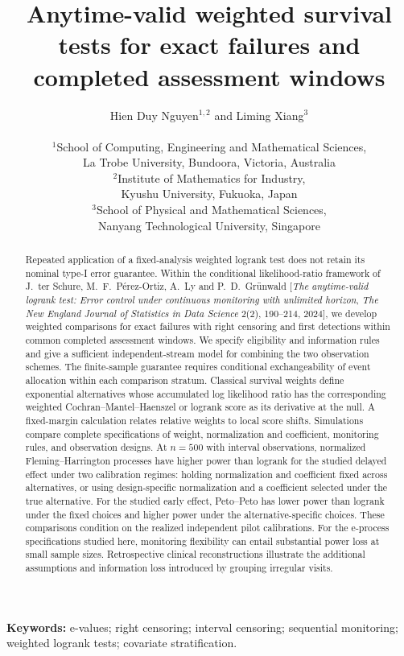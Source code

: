 \documentclass[12pt]{article}
\title{\textbf{Anytime-valid weighted survival tests for exact failures and completed assessment windows}}
\author{%
 Hien Duy Nguyen$^{1,2}$ and Liming Xiang$^3$\\[0.6em]
 \parbox{0.94\textwidth}{\centering\small
 $^1$School of Computing, Engineering and Mathematical Sciences,\\
 La Trobe University, Bundoora, Victoria, Australia\\[0.3em]
 $^2$Institute of Mathematics for Industry,\\
 Kyushu University, Fukuoka, Japan\\[0.3em]
 $^3$School of Physical and Mathematical Sciences,\\
 Nanyang Technological University, Singapore}%
}
\date{}
\theoremstyle{definition}
\theoremstyle{remark}
\begin{document}
\maketitle
\linenumbers

\begin{abstract}
Repeated application of a fixed-analysis weighted logrank test does not retain its nominal type-I error guarantee. Within the conditional likelihood-ratio framework of J.~ter Schure, M.~F.~P\'erez-Ortiz, A.~Ly and P.~D.~Gr\"unwald [\emph{The anytime-valid logrank test: Error control under continuous monitoring with unlimited horizon}, \emph{The New England Journal of Statistics in Data Science} 2(2), 190--214, 2024], we develop weighted comparisons for exact failures with right censoring and first detections within common completed assessment windows. We specify eligibility and information rules and give a sufficient independent-stream model for combining the two observation schemes. The finite-sample guarantee requires conditional exchangeability of event allocation within each comparison stratum. Classical survival weights define exponential alternatives whose accumulated log likelihood ratio has the corresponding weighted Cochran--Mantel--Haenszel or logrank score as its derivative at the null. A fixed-margin calculation relates relative weights to local score shifts. Simulations compare complete specifications of weight, normalization and coefficient, monitoring rules, and observation designs. At $n=500$ with interval observations, normalized Fleming--Harrington processes have higher power than logrank for the studied delayed effect under two calibration regimes: holding normalization and coefficient fixed across alternatives, or using design-specific normalization and a coefficient selected under the true alternative. For the studied early effect, Peto--Peto has lower power than logrank under the fixed choices and higher power under the alternative-specific choices. These comparisons condition on the realized independent pilot calibrations. For the e-process specifications studied here, monitoring flexibility can entail substantial power loss at small sample sizes. Retrospective clinical reconstructions illustrate the additional assumptions and information loss introduced by grouping irregular visits.

\end{abstract}

\noindent\textbf{Keywords:} e-values; right censoring; interval censoring; sequential monitoring; weighted logrank tests; covariate stratification.
\end{document}
